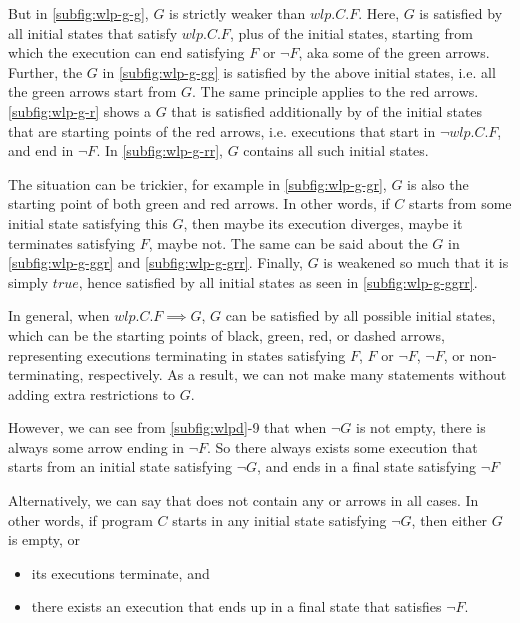 But in \autoref{subfig:wlp-g-g}, $G$ is strictly weaker than $wlp.C.F$. 
Here, $G$ is satisfied by all initial states that satisfy $wlp.C.F$, plus  of the initial states, starting from which the execution can end satisfying $F$ or $\neg F$, aka some of the green arrows. 
Further, the $G$ in \autoref{subfig:wlp-g-gg} is satisfied by  the above initial states, i.e. all the green arrows start from $G$. 
The same principle applies to the red arrows. 
\autoref{subfig:wlp-g-r} shows a $G$ that is satisfied additionally by  of the initial states that are starting points of the red arrows, i.e. executions that start in $\neg wlp.C.F$, and end in $\neg F$. 
In \autoref{subfig:wlp-g-rr}, $G$ contains all such initial states. 

The situation can be trickier, for example in \autoref{subfig:wlp-g-gr}, $G$ is also the starting point of both green and red arrows. 
In other words, if $C$ starts from some initial state satisfying this $G$, then maybe its execution diverges, maybe it terminates satisfying $F$, maybe not. 
The same can be said about the $G$ in \autoref{subfig:wlp-g-ggr} and \autoref{subfig:wlp-g-grr}. 
Finally, $G$ is weakened so much that it is simply $true$, hence satisfied by all initial states as seen in \autoref{subfig:wlp-g-ggrr}. 


In general, when $wlp.C.F\implies G$, $G$ can be satisfied by all possible initial states, which can be the starting points of black, green, red, or dashed arrows, representing executions terminating in states satisfying $F$, $F$ or $\neg F$, $\neg F$, or non-terminating, respectively. 
As a result, we can not make many statements without adding extra restrictions to $G$. 

However, we can see from \autoref{subfig:wlpd}{\color{RoyalBlue}-9} that when $\neg G$ is not empty, there is always some arrow ending in $\neg F$. 
So there always exists some execution that starts from an initial state satisfying $\neg G$, and ends in a final state satisfying $\neg F$%

Alternatively, we can say that does not contain any  or  arrows in all cases. 
In other words, if program $C$ starts in any initial state satisfying $\neg G$, then either $G$ is empty, or
\begin{itemize}
	\item its executions terminate, and
	\item there exists an execution that ends up in a final state that satisfies $\neg F$. 
\end{itemize}

